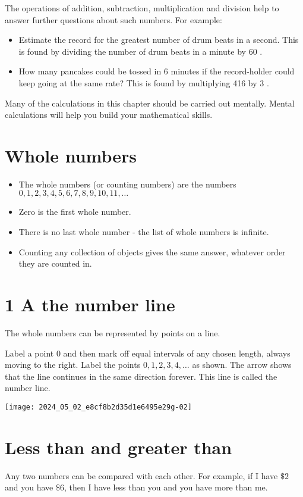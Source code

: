 \documentclass[10pt]{article}
\begin{document}
The operations of addition, subtraction, multiplication and division help to answer further questions about such numbers. For example:

\begin{itemize}
  \item Estimate the record for the greatest number of drum beats in a second. This is found by dividing the number of drum beats in a minute by 60 .
  \item How many pancakes could be tossed in 6 minutes if the record-holder could keep going at the same rate? This is found by multiplying 416 by 3 .
\end{itemize}

Many of the calculations in this chapter should be carried out mentally. Mental calculations will help you build your mathematical skills.

\section*{Whole numbers}
\begin{itemize}
  \item The whole numbers (or counting numbers) are the numbers \(0,1,2,3,4,5,6,7,8,9,10,11, \ldots\)
  \item Zero is the first whole number.
  \item There is no last whole number - the list of whole numbers is infinite.
  \item Counting any collection of objects gives the same answer, whatever order they are counted in.
\end{itemize}

\section*{1 A the number line}
The whole numbers can be represented by points on a line.

Label a point 0 and then mark off equal intervals of any chosen length, always moving to the right. Label the points \(0,1,2,3,4, \ldots\) as shown. The arrow shows that the line continues in the same direction forever. This line is called the number line.

\begin{center}
\texttt{[image: 2024\_05\_02\_e8cf8b2d35d1e6495e29g-02]}
\end{center}

\section*{Less than and greater than}
Any two numbers can be compared with each other. For example, if I have \(\$ 2\) and you have \(\$ 6\), then I have less than you and you have more than me.
\end{document}
